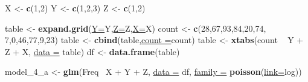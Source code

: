 \documentclass[]{article}
\newenvironment{Shaded}{\begin{snugshade}}{\end{snugshade}}
\newcommand{\KeywordTok}[1]{\textcolor[rgb]{0.26,0.66,0.93}{\textbf{{#1}}}}
\newcommand{\DataTypeTok}[1]{\textcolor[rgb]{0.74,0.68,0.62}{\underline{{#1}}}}
\newcommand{\DecValTok}[1]{\textcolor[rgb]{0.27,0.67,0.26}{{#1}}}
\newcommand{\StringTok}[1]{\textcolor[rgb]{0.02,0.61,0.04}{{#1}}}
\newcommand{\NormalTok}[1]{\textcolor[rgb]{0.74,0.68,0.62}{{#1}}}
\begin{document}
\begin{Shaded}
\begin{Highlighting}[]
\NormalTok{X <-}\StringTok{ }\KeywordTok{c}\NormalTok{(}\DecValTok{1}\NormalTok{,}\DecValTok{2}\NormalTok{)}
\NormalTok{Y <-}\StringTok{ }\KeywordTok{c}\NormalTok{(}\DecValTok{1}\NormalTok{,}\DecValTok{2}\NormalTok{,}\DecValTok{3}\NormalTok{)}
\NormalTok{Z <-}\StringTok{ }\KeywordTok{c}\NormalTok{(}\DecValTok{1}\NormalTok{,}\DecValTok{2}\NormalTok{)}

\NormalTok{table <-}\StringTok{ }\KeywordTok{expand.grid}\NormalTok{(}\DataTypeTok{Y=}\NormalTok{Y,}\DataTypeTok{Z=}\NormalTok{Z,}\DataTypeTok{X=}\NormalTok{X)}
\NormalTok{count <-}\StringTok{ }\KeywordTok{c}\NormalTok{(}\DecValTok{28}\NormalTok{,}\DecValTok{67}\NormalTok{,}\DecValTok{93}\NormalTok{,}\DecValTok{84}\NormalTok{,}\DecValTok{20}\NormalTok{,}\DecValTok{74}\NormalTok{, }\DecValTok{7}\NormalTok{,}\DecValTok{0}\NormalTok{,}\DecValTok{46}\NormalTok{,}\DecValTok{77}\NormalTok{,}\DecValTok{9}\NormalTok{,}\DecValTok{23}\NormalTok{)}
\NormalTok{table <-}\StringTok{ }\KeywordTok{cbind}\NormalTok{(table,}\DataTypeTok{count =}\NormalTok{count)}
\NormalTok{table <-}\StringTok{ }\KeywordTok{xtabs}\NormalTok{(count ~}\StringTok{ }\NormalTok{Y +}\StringTok{ }\NormalTok{Z +}\StringTok{ }\NormalTok{X, }\DataTypeTok{data =} \NormalTok{table)}
\NormalTok{df <-}\StringTok{ }\KeywordTok{data.frame}\NormalTok{(table)}

\NormalTok{model_4_a <-}\StringTok{ }\KeywordTok{glm}\NormalTok{(Freq~}\StringTok{ }\NormalTok{X +}\StringTok{ }\NormalTok{Y +}\StringTok{ }\NormalTok{Z, }\DataTypeTok{data =} \NormalTok{df, }\DataTypeTok{family  =} \KeywordTok{poisson}\NormalTok{(}\DataTypeTok{link=}\NormalTok{log))}




\end{Highlighting}
\end{Shaded}
\end{document}
